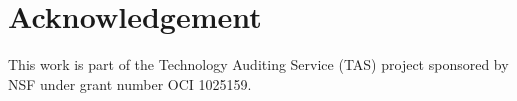 \documentclass{sig-alternate}
\begin{document}
 
 
\section*{Acknowledgement} 
 
This work is part of the Technology Auditing Service (TAS) project sponsored by NSF under grant number OCI 1025159. 
 
 
 
% 
 
 
\end{document}
